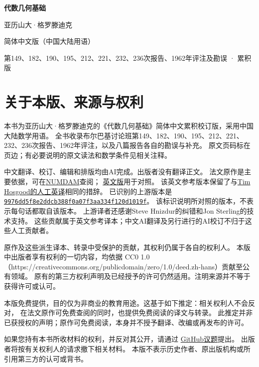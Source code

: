 \documentclass[12pt,twoside,openany]{book}
\numberwithin{equation}{section}
\theoremstyle{plain}
\theoremstyle{definition}
\theoremstyle{remark}
\begin{document}
\frontmatter
\begin{titlepage}
  \centering
  \vspace*{0.16\textheight}
  {\Huge\bfseries 代数几何基础\par}
  \vspace{1.2\baselineskip}
  {\Large 亚历山大·格罗滕迪克\par}
  \vfill
  {\large 简体中文版（中国大陆用语）\par}
  \vspace{0.5\baselineskip}
  {\normalsize 第149、182、190、195、212、221、232、236次报告、1962年评注及勘误 · 累积版\par}
\end{titlepage}
\chapter*{关于本版、来源与权利}
本书为亚历山大·格罗滕迪克的《代数几何基础》简体中文累积校订版，采用中国大陆数学用语。
全书收录布尔巴基讨论班第149、182、190、195、212、221、232、236次报告、1962年评注，以及八篇报告各自的勘误与补充。
原文页码标在页边；有必要说明的原文读法和数学条件见相关注释。

中文翻译、校订、编辑和排版均由AI完成。出版者没有翻译正文。
法文原作是主要依据，可在\href{https://www.numdam.org/}{NUMDAM}查阅；
\href{https://github.com/KokunoYumeto/fga-en}{英文版}用于对照。
该英文参考版本保留了与\href{https://github.com/thosgood/fga}{Tim Hosgood的人工英译}相同的措辞。
已识别的上游版本是
\href{https://github.com/thosgood/fga/tree/9976dd5f8e2ddcb388f0a07f3aa334f120d1019f}{\nolinkurl{9976dd5f8e2ddcb388f0a07f3aa334f120d1019f}}。
该标识说明所对照的版本，不表示每句话都取自该版本。
上游译者还感谢Steve Hnizdur的纠错和Jon Sterling的技术支持。
这些贡献属于英文参考译本；中文AI翻译及另行进行的AI校订不归于这些人工贡献者。

原作及这些派生译本、转录中受保护的贡献，其权利仍属于各自的权利人。
本版中出版者享有权利的一切内容，均依据 CC0 1.0（https://creativecommons.org/publicdomain/zero/1.0/deed.zh-hans）贡献至公有领域。
原有的第三方权利声明及已经授予的许可仍然适用。注明来源并不等于获得许可或认可。

本版免费提供，目的仅为非商业的教育用途。这基于如下推定：相关权利人不会反对，
在法文原作可免费查阅的同时，也提供免费阅读的译文与转录。
此推定并非已获授权的声明；原作可免费阅读，本身并不授予翻译、改编或再发布的许可。

如果您持有本书所收材料的权利，并反对其公开，请通过
\href{https://github.com/KokunoYumeto/fga-zh-hans-cn/issues}{GitHub议题}提出。
出版者将按有关权利人的请求撤下相关材料。
本版不表示历史作者、原出版机构或所引用第三方的认可或背书。
\clearpage
\end{document}
